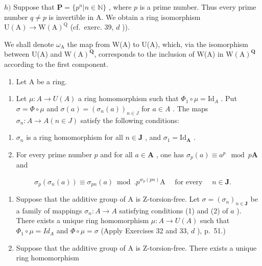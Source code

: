   \(h)\) Suppose that \(\mathbf{P} = \{p^n | n \in \mathbb{N}\}\) , where \(p\) is a prime number. Thus every prime number \(q \neq p\) is invertible in A. We obtain a ring isomorphism \(\mathrm{U(A)} \to \mathrm{W(A)}^{\mathrm{Q}}\) (cf.~exerc. 39, \(d\) )).

We shall denote \(\omega_{\mathrm{A}}\) the map from W(A) to U(A), which, via the isomorphism between U(A) and \(\mathrm{W(A)}^{\mathbf{Q}}\), corresponds to the inclusion of W(A) in \(\mathrm{W(A)}^{\mathbf{Q}}\) according to the first component.

\begin{enumerate}
\def\labelenumi{\arabic{enumi})}
\setcounter{enumi}{40}
\tightlist
\item
  Let A be a ring.
\end{enumerate}

\begin{enumerate}
\def\labelenumi{\alph{enumi})}
\tightlist
\item
  Let \(\mu: A \to U(A)\) a ring homomorphism such that \(\Phi_1 \circ \mu = \text{Id}_A\) . Put \(\sigma = \Phi \circ \mu\) and \(\sigma(a) = (\sigma_n(a))_{n \in J}\) for \(a \in A\) . The maps \(\sigma_n: A \to A (n \in J)\) satisfy the following conditions:
\end{enumerate}

\begin{enumerate}
\def\labelenumi{(\arabic{enumi})}
\item
  \(\sigma_{n}\) is a ring homomorphism for all \(n\in\mathbf{J}\) , and \(\sigma_{1}=\mathrm{Id}_{\mathbf{A}}\) .
\item
  For every prime number \(p\) and for all \(a \in \mathbf{A}\) , one has \(\sigma_p(a) \equiv a^p \mod p\mathbf{A}\) and
\end{enumerate}

\[
\sigma_ {p} \left(\sigma_ {n} (a)\right) \equiv \sigma_ {p n} (a) \bmod . p ^ {w _ {p} (p n)} \mathrm{A} \quad \text { for every } \quad n \in \mathbf {J}.
\]

\begin{enumerate}
\def\labelenumi{\alph{enumi})}
\setcounter{enumi}{1}
\item
  Suppose that the additive group of A is Z-torsion-free. Let \(\sigma = (\sigma_n)_{n \in \mathbf{J}}\) be a family of mappings \(\sigma_n: A \to A\) satisfying conditions (1) and (2) of \(a\) ). There exists a unique ring homomorphism \(\mu: A \to U(A)\) such that \(\Phi_1 \circ \mu = Id_A\) and \(\Phi \circ \mu = \sigma\) (Apply Exercises 32 and 33, \(d\) ), p.~51.)
\item
  Suppose that the additive group of A is Z-torsion-free. There exists a unique ring homomorphism
\end{enumerate}

